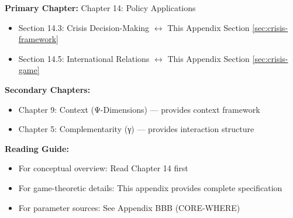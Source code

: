 \begin{tcolorbox}[colback=purple!5!white, colframe=purple!75!black,
    title=Chapter Linkage]

\textbf{Primary Chapter:} Chapter 14: Policy Applications
\begin{itemize}[nosep]
\item Section 14.3: Crisis Decision-Making $\leftrightarrow$ This Appendix Section \ref{sec:crisis-framework}
\item Section 14.5: International Relations $\leftrightarrow$ This Appendix Section \ref{sec:crisis-game}
\end{itemize}

\textbf{Secondary Chapters:}
\begin{itemize}[nosep]
\item Chapter 9: Context (Ψ-Dimensions) --- provides context framework
\item Chapter 5: Complementarity (γ) --- provides interaction structure
\end{itemize}

\textbf{Reading Guide:}
\begin{itemize}[nosep]
\item For conceptual overview: Read Chapter 14 first
\item For game-theoretic details: This appendix provides complete specification
\item For parameter sources: See Appendix BBB (CORE-WHERE)
\end{itemize}

\end{tcolorbox}


\begin{abstract}
This appendix develops a formal framework for modeling geopolitical crisis escalation using sequential game theory integrated with the EBF context framework. We specify how state actors make decisions under incomplete information, how context dimensions ($\Psi$) modify utility functions and beliefs, and how to derive testable predictions using Subgame Perfect Equilibrium (SPE). The framework is demonstrated through the US-Iran Crisis Model (MOD-GEO-001), showing how behavioral economics enriches traditional international relations theory.
\end{abstract}


